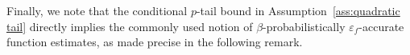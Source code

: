 \documentclass[11pt,a4paper]{article}
\newtheorem{lemma}{Lemma}[section]
\newenvironment{proof}[1][Proof]{%
  \par\noindent\textbf{#1.}\ %
}{%
  \par\vspace{-0.5 ex}            %
  \noindent\hfill\rule{0.5em}{0.5em}\par
  \vspace{1ex}
}
\newcommand{\Dexp}{p}
\begin{document}
\noindent
Finally, we note that the conditional \(\Dexp\)-tail bound in
Assumption~\ref{ass:quadratic tail} directly implies the commonly used notion of
\(\beta\)-probabilistically \(\varepsilon_f\)-accurate function estimates, as
made precise in the following remark.
\end{document}
